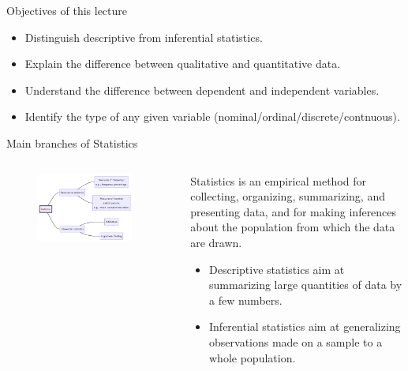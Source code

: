 \documentclass[
  ignorenonframetext,
]{beamer}
\begin{document}
\begin{frame}{Objectives of this lecture}
\protect\hypertarget{objectives-of-this-lecture}{}
\begin{itemize}
\item
  Distinguish descriptive from inferential statistics.
\item
  Explain the difference between qualitative and quantitative data.
\item
  Understand the difference between dependent and independent variables.
\item
  Identify the type of any given variable
  (nominal/ordinal/discrete/contnuous).
\end{itemize}
\end{frame}

\begin{frame}{Main branches of Statistics}
\protect\hypertarget{main-branches-of-statistics}{}
\begin{columns}[T]
\begin{column}{0.7\textwidth}
\begin{figure}

\includegraphics[width=0.9\textwidth,height=\textheight]{images_slides/branches3.png} \hfill{}

\end{figure}
\end{column}

\begin{column}{0.3\textwidth}
Statistics is an empirical method for collecting, organizing,
summarizing, and presenting data, and for making inferences about the
population from which the data are drawn.

\begin{itemize}
\item
  Descriptive statistics aim at {summarizing} large quantities of data
  by a few numbers.
\item
  Inferential statistics aim at {generalizing} observations made on a
  sample to a whole population.
\end{itemize}
\end{column}
\end{columns}
\end{frame}
\end{document}
